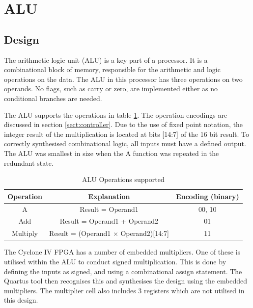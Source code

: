 

\section{ALU}

\subsection{Design}
The arithmetic logic unit (ALU) is a key part of a processor. 
It is a combinational block of memory, responsible for the arithmetic and logic operations on the data.
The ALU in this processor has three operations on two operands.
No flags, such as carry or zero, are implemented either as no conditional branches are needed.

The ALU supports the operations in table \ref{tab:aluops}.
The operation encodings are discussed in section \ref{sect:controller}.
Due to the use of fixed point notation, the integer result of the multiplication is located at bits [14:7] of the 16 bit result.
To correctly synthesised combinational logic, all inputs must have a defined output.
The ALU was smallest in size when the A function was repeated in the redundant state.

\begin{table}
\caption{ALU Operations supported}
\label{tab:aluops}
\begin{tabular}{|c|c|c|} \hline
Operation & Explanation & Encoding (binary)\\  \hline
A & Result = Operand1 & 00, 10 \\
Add & Result = Operand1 + Operand2 & 01 \\
Multiply & Result = (Operand1 $\times$ Operand2)[14:7] & 11 \\ \hline
\end{tabular}
\end{table}


The Cyclone IV FPGA has a number of embedded multipliers. 
One of these is utilised within the ALU to conduct signed multiplication. 
This is done by defining the inputs as signed, and using a combinational assign statement.
The Quartus tool then recognises this and synthesises the design using the embedded multipliers.
The multiplier cell also includes 3 registers which are not utilised in this design.



